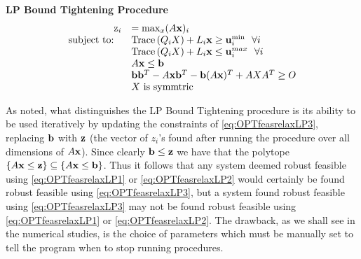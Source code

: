 \textbf{LP Bound Tightening Procedure}
\begin{equation}\label{eq:OPTfeasrelaxLP3}
\begin{array}{rl}
\mathrm{z}_{i} &  = \max_x (A\mathbf{x})_i  \\
 \text{subject to: } \ &\operatorname{Trace}\left(Q_iX\right)+ L_i\mathbf{x} \geq \mathbf{u}_i^{\min}  \ \ \forall i\\
 & \operatorname{Trace}\left(Q_iX\right)+ L_i\mathbf{x} \leq \mathbf{u}_i^{max}  \ \ \forall i\\
 	&A\mathbf{x}\leq \mathbf{b} \\
 	&\mathbf{b}\mathbf{b}^T-A\mathbf{x}\mathbf{b}^T-\mathbf{b}(A\mathbf{x})^T+AXA^T\geq O \\
 	&X \text{ is symmtric}
\end{array}
\end{equation}


As noted, what distinguishes the LP Bound Tightening procedure is its ability to be used iteratively by updating the constraints of \cref{eq:OPTfeasrelaxLP3}, replacing $\mathbf{b}$ with $\mathbf{z}$ (the vector of $z_i$'s found after running the procedure over all dimensions of $A\mathbf{x}$). 
Since clearly $\mathbf{b}\leq \mathbf{z}$ we have that the polytope $\{A\mathbf{x}\leq \mathbf{z}\}\subseteq\{A\mathbf{x}\leq \mathbf{b}\}$. 
Thus it follows that any system deemed robust feasible using \cref{eq:OPTfeasrelaxLP1} or \cref{eq:OPTfeasrelaxLP2} would certainly be found robust feasible using \cref{eq:OPTfeasrelaxLP3}, but a system found robust feasible using \cref{eq:OPTfeasrelaxLP3} may not be found robust feasible using \cref{eq:OPTfeasrelaxLP1} or \cref{eq:OPTfeasrelaxLP2}. 
The drawback, as we shall see in the numerical studies, is the choice of parameters which must be manually set to tell the program when to stop running procedures. 

